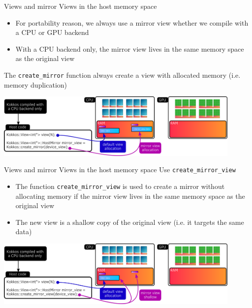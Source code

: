 \documentclass[aspectratio=169]{beamer}
\begin{document}
\begin{frame}{Views and mirror Views in the host memory space}
    \begin{itemize}
        \item For portability reason, we always use a mirror view whether we compile with a CPU or GPU backend
        \item With a CPU backend only, the mirror view lives in the same memory space as the original view
    \end{itemize}

     The \texttt{create\_mirror} function always create a view with allocated memory (i.e. memory duplication)

    \begin{center}
        \includegraphics[width=0.9\textwidth]{host_mirror_view.png}
    \end{center}
\end{frame}


\begin{frame}{Views and mirror Views in the host memory space}
     Use \texttt{create\_mirror\_view}

    \begin{itemize}
        \item The function \texttt{create\_mirror\_view} is used to create a mirror without allocating memory if the mirror view lives in the same memory space as the original view
        \item The new view is a shallow copy of the original view (i.e. it targets the same data)
    \end{itemize}
    \begin{center}
        \includegraphics[width=0.9\textwidth]{host_create_mirror_view.png}
    \end{center}
\end{frame}
\end{document}
